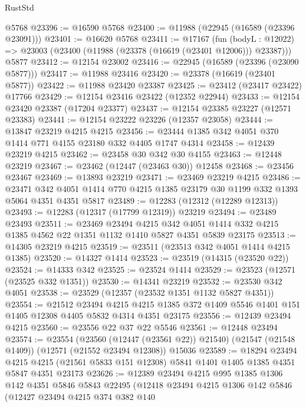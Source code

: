 \begin{lexlean}{RustStd}
\begin{coremodule}
    @5768
@23396 := @16590 @5768
@23400 := @11988 (@22945 (@16589 (@23396 @23091)))
@23401 := @16620 @5768
@23411 := @17167
    (fun (bodyL : @12022) => @23003 (@23400 (@11988 (@23378 (@16619 (@23401 @12006))) @23387)))
    @5877
@23412 := @12154 @23002
@23416 := @22945 (@16589 (@23396 (@23090 @5877)))
@23417 := @11988 @23416
@23420 := @23378 (@16619 (@23401 @5877))
@23422 := @11988 @23420 @23387
@23425 := @23412 (@23417 @23422) @17766
@23429 := @12154 @23416 @23422 (@12352 @22944)
@23433 := @12154 @23420 @23387 (@17204 @23377)
@23437 := @12154 @23385 @23227 (@12571 @23383)
@23441 := @12154 @23222 @23226 (@12357 @23058)
@23444 := @13847 @23219 @4215 @4215
@23456 := @23444 @1385 @342 @4051 @370 @1414 @771 @4155 @23180 @332 @4405 @1747 @4314
@23458 := @12439 @23219 @4215
@23462 := @23458 @30 @342 @30 @4155
@23463 := @12448 @23219
@23467 := @23462 (@12447 (@23463 @30)) @12458
@23468 := @23456 @23467
@23469 := @13893 @23219
@23471 := @23469 @23219 @4215
@23486 := @23471
    @342
    @4051
    @1414
    @770
    @4215
    @1385
    @23179
    @30
    @1199
    @332
    @1393
    @5064
    @4351
    @4351
    @5817
@23489 := @12283 (@12312 (@12289 @12313))
@23493 := @12283 (@12317 (@17799 @12319)) @23219
@23494 := @23489 @23493
@23511 := @23469
    @23494
    @4215
    @342
    @4051
    @1414
    @332
    @4215
    @1385
    @4562
    @22
    @1351
    @1132
    @1410
    @5827
    @4351
    @5839
    @23175
@23513 := @14305 @23219 @4215
@23519 := @23511 (@23513 @342 @4051 @1414 @4215 @1385)
@23520 := @14327 @1414
@23523 := @23519 (@14315 (@23520 @22))
@23524 := @14333 @342
@23525 := @23524 @1414
@23529 := @23523 (@12571 (@23525 @332 @1351))
@23530 := @14341 @23219
@23532 := @23530 @342 @4051
@23538 := @23529 (@12357 (@23532 @1351 @1132 @5827 @4351))
@23554 := @21512
    @23494
    @4215
    @4215
    @1385
    @372
    @1409
    @5546
    @1401
    @151
    @1405
    @12308
    @4405
    @5832
    @4314
    @4351
    @23175
@23556 := @12439 @23494 @4215
@23560 := @23556 @22 @37 @22 @5546
@23561 := @12448 @23494
@23574 := @23554
    (@23560 (@12447 (@23561 @22)) @21540)
    (@21547 (@21548 @1409))
    (@12571 (@21552 @23494 @12308))
    @15036
@23589 := @18294
    @23494
    @4215
    @4215
    (@21561 @5833 @151 @12308)
    @5841
    @1401
    @1405
    @1385
    @4351
    @5847
    @4351
    @23173
@23626 := @12389
    @23494
    @4215
    @995
    @1385
    @1306
    @142
    @4351
    @5846
    @5843
    @22495
    (@12418
      @23494
      @4215
      @1306
      @142
      @5846
      (@12427
        @23494
        @4215
        @374
        @382
        @140

\end{coremodule}
\end{lexlean}
